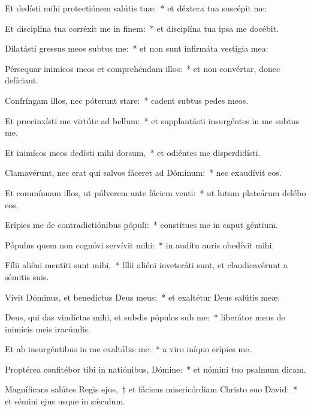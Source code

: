 
\item Et dedísti mihi protectiónem salútis tuæ:~* et déxtera tua suscépit me:

\item Et disciplína tua corréxit me in finem:~* et disciplína tua ipsa me docébit.

\item Dilatásti gressus meos subtus me:~* et non sunt infirmáta vestígia mea:

\item Pérsequar inimícos meos et comprehéndam illos:~* et non convértar, donec defíciant.

\item Confríngam illos, nec póterunt stare:~* cadent subtus pedes meos.

\item Et præcinxísti me virtúte ad bellum:~* et supplantásti insurgéntes in me subtus me.

\item Et inimícos meos dedísti mihi dorsum,~* et odiéntes me disperdidísti.

\item Clamavérunt, nec erat qui salvos fáceret ad Dóminum:~* nec exaudívit eos.

\item Et commínuam illos, ut púlverem ante fáciem venti:~* ut lutum plateárum delébo eos.

\item Erípies me de contradictiónibus pópuli:~* constítues me in caput géntium.

\item Pópulus quem non cognóvi servívit mihi:~* in audítu auris obedívit mihi.

\item Fílii aliéni mentíti sunt mihi,~* fílii aliéni inveteráti sunt, et claudicavérunt a sémitis suis.

\item Vivit Dóminus, et benedíctus Deus meus:~* et exaltétur Deus salútis meæ.

\item Deus, qui das vindíctas mihi, et subdis pópulos sub me:~* liberátor meus de inimícis meis iracúndis.

\item Et ab insurgéntibus in me exaltábis me:~* a viro iníquo erípies me.

\item Proptérea confitébor tibi in natiónibus, Dómine:~* et nómini tuo psalmum dicam.

\item Magníficans salútes Regis ejus,~† et fáciens misericórdiam Christo suo David:~* et sémini ejus usque in sǽculum.